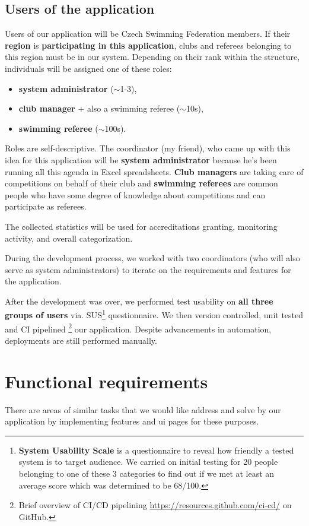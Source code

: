 \subsection*{Users of the application}
Users of our application will be Czech Swimming Federation members. If their \textbf{region} is \textbf{participating in this application}, clubs and referees belonging to this region must be in our system. Depending on their rank within the structure, individuals will be assigned one of these roles: 
\begin{itemize}
  \item \textbf{system administrator} ($\sim$1-3),
  \item \textbf{club manager} + also a swimming referee ($\sim$10s),
  \item \textbf{swimming referee} ($\sim$100s).
\end{itemize} 
Roles are self-descriptive. The coordinator (my friend), who came up with this idea for this application will be \textbf{system administrator} because he's been running all this agenda in Excel spreadsheets. \textbf{Club managers} are taking care of competitions on behalf of their club and \textbf{swimming referees} are common people who have some degree of knowledge about competitions and can participate as referees. \par 
The collected statistics will be used for accreditations granting, monitoring activity, and overall categorization.
\par
During the development process, we worked with two coordinators (who will also serve as system administrators) to iterate on the requirements and features for the application. \par
After the development was over, we performed test usability on \textbf{all three groups of users} via. SUS\footnote{\textbf{System Usability Scale} is a questionnaire to reveal how friendly a tested system is to target audience. We carried on initial testing for 20 people belonging to one of these 3 categories to find out if we met at least an average score which was determined to be 68/100.} questionnaire. We then version controlled, unit tested and CI pipelined \footnote{Brief overview of CI/CD pipelining \url{https://resources.github.com/ci-cd/} on GitHub.} our application. Despite advancements in automation, deployments are still performed manually.
\section{Functional requirements}
There are areas of similar tasks that we would like address and solve by our application by implementing features and ui pages for these purposes.
